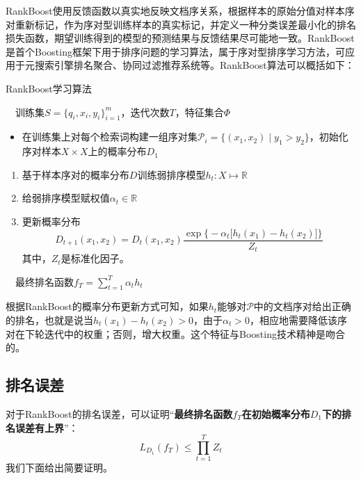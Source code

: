 RankBoost使用反馈函数以真实地反映文档序关系，根据样本的原始分值对样本序对重新标记，作为序对型训练样本的真实标记，并定义一种分类误差最小化的排名损失函数，期望训练得到的模型的预测结果与反馈结果尽可能地一致。RankBoost是首个Boosting框架下用于排序问题的学习算法，属于序对型排序学习方法，可应用于元搜索引擎排名聚合、协同过滤推荐系统等。RankBoost算法可以概括如下：

\begin{algorithm}[htbp]
        \caption{RankBoost学习算法}
        \begin{algorithmic}
            \REQUIRE ~~训练集$S=\{q_i,x_i,y_i\}^m_{i=1}$，迭代次数$T$，特征集合$\varPhi$\\
            \STATE
            \begin{itemize}
              \item 在训练集上对每个检索词构建一组序对集$\mathscr P_i = \{(x_1, x_2)\mid y_1 > y_2\}$，初始化序对样本$X\times X$上的概率分布$D_1$
            \end{itemize}
            \STATE
            \begin{enumerate}
              \item 基于样本序对的概率分布$D$训练弱排序模型$h_t:X\mapsto \mathbb{R}$
              \item 给弱排序模型赋权值$\alpha_t \in \mathbb{R}$
              \item 更新概率分布
              \begin{equation}
                D_{t+1}(x_1,x_2) = D_t(x_1,x_2) \frac{\exp\big\{-\alpha_t \big[h_t(x_1) - h_t(x_2)\big]\big\}}{Z_t}
              \end{equation}
              其中，$Z_t$是标准化因子。
            \end{enumerate}
            \ENDFOR
            \ENSURE ~~最终排名函数$f_T = \sum\limits_{t=1}^{T}{\alpha_t h_t}$
        \end{algorithmic}
\end{algorithm}

根据RankBoost的概率分布更新方式可知，如果$h_t$能够对$\mathscr P$中的文档序对给出正确的排名，也就是说当$h_t(x_1) - h_t(x_2)>0$，由于$\alpha_t>0$，相应地需要降低该序对在下轮迭代中的权重；否则，增大权重。这个特征与Boosting技术精神是吻合的。

\subsection{排名误差}
对于RankBoost的排名误差，可以证明“\textbf{最终排名函数$f_T$在初始概率分布$D_1$下的排名误差有上界}”：
\begin{equation}
    L_{D_1}(f_T) \le \prod_{t=1}^T Z_t
\end{equation}
我们下面给出简要证明。

